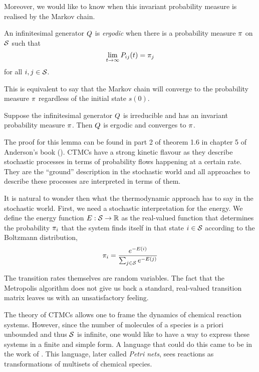 Moreover, we would like to know when this invariant
probability measure is realised by the Markov chain.

\begin{definition}[ergodicity]
  An infinitesimal generator $Q$ is \emph{ergodic} when
  there is a probability measure $\pi$ on $\mathcal{S}$ such that
  \[ \lim_{t \to \infty} P_{ij}(t) = \pi_j \]
  for all $i,j \in \mathcal{S}$.
\end{definition}

This is equivalent to say that the Markov chain
will converge to the probability measure $\pi$
regardless of the initial state $s(0)$.

\begin{lemma}
  Suppose the infinitesimal generator $Q$ is irreducible
  and has an invariant probability measure $\pi$.
  Then $Q$ is ergodic and converges to $\pi$.
\end{lemma}

The proof for this lemma can be found in part 2 of theorem 1.6
in chapter 5 of Anderson's book (\cite*[][pages 160--161]{anderson}).
CTMCs have a strong kinetic flavour as they describe
stochastic processes in terms of probability flows
happening at a certain rate.
They are the ``ground'' description in the stochastic world
and all approaches to describe these processes
are interpreted in terms of them.

It is natural to wonder then what the thermodynamic approach
has to say in the stochastic world.
First, we need a stochastic interpretation for the energy.
We define the energy function $E: \mathcal{S} \to \mathbb{R}$
as the real-valued function that determines the probability $\pi_i$
that the system finds itself in that state $i \in \mathcal{S}$
according to the Boltzmann distribution, \ie
\begin{equation}
  \pi_i = \frac{e^{-E(i)}}{\sum_{j \in \mathcal{S}} e^{-E(j)}}
\end{equation}

The transition rates themselves are random variables.
The fact that the Metropolis algorithm does not give us
back a standard, real-valued transition matrix
leaves us with an unsatisfactory feeling.

The theory of CTMCs allows one to frame
the dynamics of chemical reaction systems.
However, since the number of molecules of a species
is a priori unbounded and thus $\mathcal{S}$ is infinite,
one would like to have a way to express these systems
in a finite and simple form.
A language that could do this
came to be in the work of \citet{petri}.
This language, later called \emph{Petri nets},
sees reactions as transformations of
multisets of chemical species.

